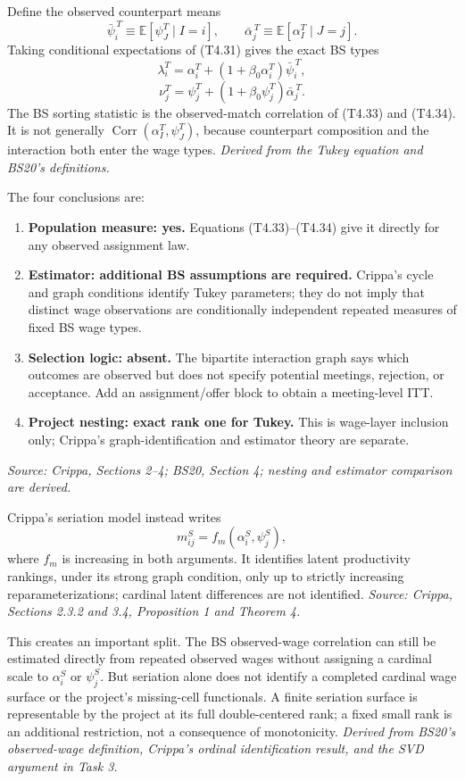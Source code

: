 \documentclass[11pt]{article}
\begin{document}
Define the observed counterpart means
\[
\bar\psi_i^{\,T}
\equiv
\mathbb E[\psi_J^T\mid I=i],
\qquad
\bar\alpha_j^{\,T}
\equiv
\mathbb E[\alpha_I^T\mid J=j].
\tag{T4.32}
\]
Taking conditional expectations of (T4.31) gives the exact BS types
\[
\lambda_i^T
=
\alpha_i^T
+\left(1+\beta_0\alpha_i^T\right)
\bar\psi_i^{\,T},
\tag{T4.33}
\]
\[
\nu_j^T
=
\psi_j^T
+\left(1+\beta_0\psi_j^T\right)
\bar\alpha_j^{\,T}.
\tag{T4.34}
\]
The BS sorting statistic is the observed-match correlation of (T4.33) and
(T4.34).  It is not generally
\(\operatorname{Corr}(\alpha_I^T,\psi_J^T)\), because counterpart composition
and the interaction both enter the wage types.
\textit{Derived from the Tukey equation and BS20's definitions.}

The four conclusions are:

\begin{enumerate}
\item \textbf{Population measure: yes.}  Equations (T4.33)--(T4.34) give it
  directly for any observed assignment law.
\item \textbf{Estimator: additional BS assumptions are required.}  Crippa's
  cycle and graph conditions identify Tukey parameters; they do not imply
  that distinct wage observations are conditionally independent repeated
  measures of fixed BS wage types.
\item \textbf{Selection logic: absent.}  The bipartite interaction graph says
  which outcomes are observed but does not specify potential meetings,
  rejection, or acceptance.  Add an assignment/offer block to obtain a
  meeting-level ITT.
\item \textbf{Project nesting: exact rank one for Tukey.}  This is wage-layer
  inclusion only; Crippa's graph-identification and estimator theory are
  separate.
\end{enumerate}

\textit{Source: Crippa, Sections 2--4; BS20, Section 4; nesting and estimator
comparison are derived.}

Crippa's seriation model instead writes
\[
m^S_{ij}=f_m(\alpha_i^S,\psi_j^S),
\tag{T4.35}
\]
where \(f_m\) is increasing in both arguments.  It identifies latent
productivity rankings, under its strong graph condition, only up to strictly
increasing reparameterizations; cardinal latent differences are not
identified.
\textit{Source: Crippa, Sections 2.3.2 and 3.4, Proposition 1 and
Theorem 4.}

This creates an important split.  The BS observed-wage correlation can still
be estimated directly from repeated observed wages without assigning a
cardinal scale to \(\alpha_i^S\) or \(\psi_j^S\).  But seriation alone does not
identify a completed cardinal wage surface or the project's missing-cell
functionals.  A finite seriation surface is representable by the project at
its full double-centered rank; a fixed small rank is an additional
restriction, not a consequence of monotonicity.
\textit{Derived from BS20's observed-wage definition, Crippa's ordinal
identification result, and the SVD argument in Task 3.}
\end{document}
